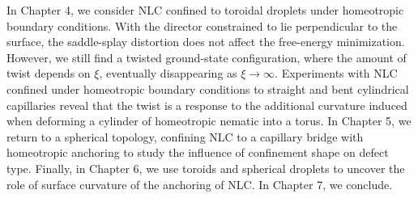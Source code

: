 In Chapter 4, we consider NLC confined to toroidal droplets under homeotropic boundary conditions.
With the director constrained to lie perpendicular to the surface, the saddle-splay distortion does not affect the free-energy minimization.
However, we still find a twisted ground-state configuration, where the amount of twist depends on $\xi$, eventually disappearing as $\xi \rightarrow \infty$.
Experiments with NLC confined under homeotropic boundary conditions to straight and bent cylindrical capillaries reveal that the twist is a response to the additional curvature induced when deforming a cylinder of homeotropic nematic into a torus.
In Chapter 5, we return to a spherical topology, confining NLC to a capillary bridge with homeotropic anchoring to study the influence of confinement shape on defect type.
Finally, in Chapter 6, we use toroids and spherical droplets to uncover the role of surface curvature of the anchoring of NLC.
In Chapter 7, we conclude.
